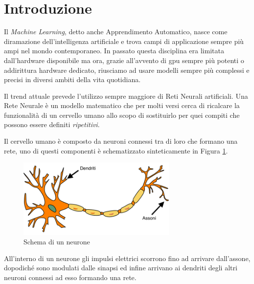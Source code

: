 \chapter*{Introduzione}
Il \textit{Machine Learning}, detto anche Apprendimento Automatico, nasce come diramazione dell'intelligenza artificiale e trova  campi di applicazione sempre più ampi nel mondo contemporaneo.  
In passato questa disciplina era limitata dall'hardware disponibile ma ora, grazie all'avvento di \ac{gpu} sempre più potenti o addirittura hardware dedicato, riusciamo ad usare modelli sempre più complessi e precisi in diversi ambiti della vita quotidiana. 

Il trend attuale prevede l'utilizzo sempre maggiore di Reti Neurali artificiali. Una Rete Neurale è un modello matematico che per molti versi cerca di ricalcare la funzionalità 
di un cervello umano allo scopo di sostituirlo per quei compiti che possono essere definiti \textit{ripetitivi}. 

Il cervello umano è composto da neuroni connessi tra di loro che formano una rete, uno di questi componenti è schematizzato sinteticamente in Figura \ref{fig:neurone}. 
\begin{figure}[]
    \centering
    \includegraphics[width = 0.7\textwidth]{images/neurone.png}
    \caption{Schema di un neurone}
    \label{fig:neurone}
\end{figure}
All'interno di un neurone gli impulsi elettrici scorrono fino ad arrivare dall'assone, dopodiché sono modulati dalle sinapsi ed infine arrivano ai dendriti degli altri neuroni connessi ad esso formando una rete.

